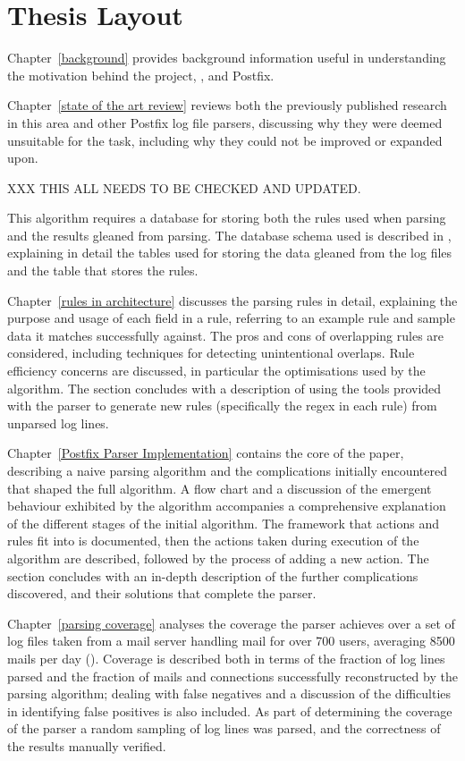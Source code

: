 \section{Thesis Layout}

Chapter~\ref{background} provides background information useful in
understanding the motivation behind the project, , and
Postfix.

Chapter~\ref{state of the art review} reviews both the previously published
research in this area and other Postfix log file parsers, discussing why
they were deemed unsuitable for the task, including why they could not be
improved or expanded upon.

XXX THIS ALL NEEDS TO BE CHECKED AND UPDATED\@.

This algorithm requires a database for storing both the rules used when
parsing and the results gleaned from parsing.  The database schema used is
described in , explaining in detail the tables
used for storing the data gleaned from the log files and the table that
stores the rules.

Chapter~\ref{rules in architecture} discusses the parsing rules in detail,
explaining the purpose and usage of each field in a rule, referring to an
example rule and sample data it matches successfully against.  The pros and
cons of overlapping rules are considered, including techniques for
detecting unintentional overlaps.  Rule efficiency concerns are discussed,
in particular the optimisations used by the algorithm.  The section
concludes with a description of using the tools provided with the parser to
generate new rules (specifically the regex in each rule) from unparsed log
lines.

Chapter~\ref{Postfix Parser Implementation} contains the core of the paper,
describing a naive parsing algorithm and the complications initially
encountered that shaped the full algorithm.  A flow chart and a discussion
of the emergent behaviour exhibited by the algorithm accompanies a
comprehensive explanation of the different stages of the initial algorithm.
The framework that actions and rules fit into is documented, then the
actions taken during execution of the algorithm are described, followed by
the process of adding a new action.  The section concludes with an in-depth
description of the further complications discovered, and their solutions
that complete the parser.

Chapter~\ref{parsing coverage} analyses the coverage the parser achieves
over a set of \numberOFlogFILES{} log files taken from a mail server
handling mail for over 700 users, averaging 8500 mails per day
().  Coverage is described both
in terms of the fraction of log lines parsed and the fraction of mails and
connections successfully reconstructed by the parsing algorithm; dealing
with false negatives and a discussion of the difficulties in identifying
false positives is also included.  As part of determining the coverage of
the parser a random sampling of log lines was parsed, and the correctness
of the results manually verified.

